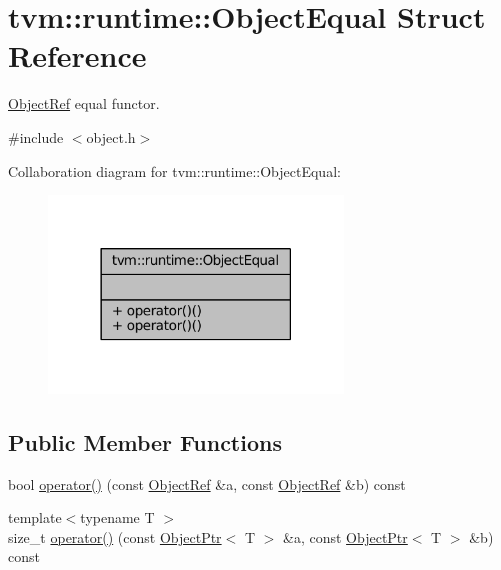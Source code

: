 \hypertarget{structtvm_1_1runtime_1_1ObjectEqual}{}\section{tvm\+:\+:runtime\+:\+:Object\+Equal Struct Reference}
\label{structtvm_1_1runtime_1_1ObjectEqual}


\hyperlink{classtvm_1_1runtime_1_1ObjectRef}{Object\+Ref} equal functor.  




{\ttfamily \#include $<$object.\+h$>$}



Collaboration diagram for tvm\+:\+:runtime\+:\+:Object\+Equal\+:
\nopagebreak
\begin{figure}[H]
\begin{center}
\leavevmode
\includegraphics[width=222pt]{structtvm_1_1runtime_1_1ObjectEqual__coll__graph}
\end{center}
\end{figure}
\subsection*{Public Member Functions}
\begin{DoxyCompactItemize}
\item 
bool \hyperlink{structtvm_1_1runtime_1_1ObjectEqual_a101b7706be844b57dc93f64ca291b9d6}{operator()} (const \hyperlink{classtvm_1_1runtime_1_1ObjectRef}{Object\+Ref} \&a, const \hyperlink{classtvm_1_1runtime_1_1ObjectRef}{Object\+Ref} \&b) const 
\item 
{\footnotesize template$<$typename T $>$ }\\size\+\_\+t \hyperlink{structtvm_1_1runtime_1_1ObjectEqual_a555703d5fa104019ce1fb79c35151314}{operator()} (const \hyperlink{classtvm_1_1runtime_1_1ObjectPtr}{Object\+Ptr}$<$ T $>$ \&a, const \hyperlink{classtvm_1_1runtime_1_1ObjectPtr}{Object\+Ptr}$<$ T $>$ \&b) const 
\end{DoxyCompactItemize}


